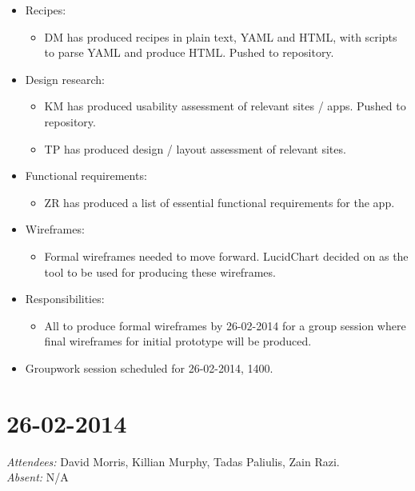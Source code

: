 \documentclass{article}
\begin{document}
\begin{itemize}
\item Recipes:
  \begin{itemize}
  \item DM has produced recipes in plain text, YAML and HTML, with scripts to parse YAML and produce HTML. Pushed to repository.
  \end{itemize}
\item Design research:
  \begin{itemize}
  \item KM has produced usability assessment of relevant sites / apps. Pushed to repository.
  \item TP has produced design / layout assessment of relevant sites.
  \end{itemize}
\item Functional requirements:
  \begin{itemize}
  \item ZR has produced a list of essential functional requirements for the app.
  \end{itemize}
\item Wireframes:
  \begin{itemize}
  \item Formal wireframes needed to move forward. LucidChart decided on as the tool to be used for producing these wireframes.
  \end{itemize}
\item Responsibilities:
  \begin{itemize}
  \item All to produce formal wireframes by 26-02-2014 for a group session where final wireframes for initial prototype will be produced.
  \end{itemize}
\item Groupwork session scheduled for 26-02-2014, 1400.
\end{itemize}

\clearpage

\section*{26-02-2014}
\vspace{0.5cm}
\emph{Attendees: }David Morris, Killian Murphy, Tadas Paliulis, Zain Razi.
\\
\emph{Absent: }N/A
\end{document}
